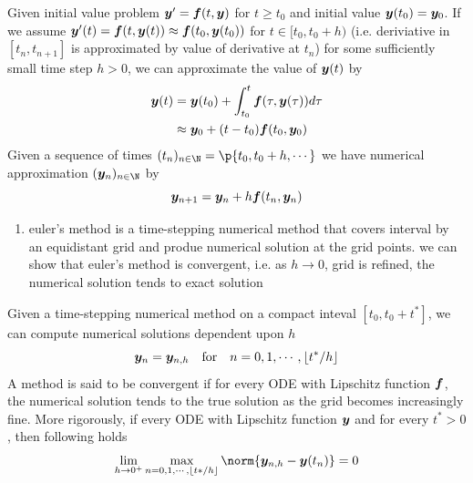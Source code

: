 \documentclass[11pt]{article}
\begin{document}
\begin{definition*}
     Given initial value problem $\by' = \bf(t, \by)$ for $t\geq t_0$ and initial value $\by(t_0) = \by_0$. If we assume $\by'(t) = \bf(t, \by(t)) \approx \bf(t_0, \by(t_0))$ for $t\in [t_0,t_0+h)$ (i.e. deriviative in $[t_n, t_{n+1}]$ is approximated by value of derivative at $t_n$) for some sufficiently small time step $h>0$, we can approximate the value of $\by(t)$ by
    \begin{align*}
        \by(t) 
        &= \by(t_0) + \int_{t_0}^t \bf(\tau, \by(\tau)) d\tau  \\
        &\approx \by_0 + (t-t_0) \bf(t_0, \by_0)
    \end{align*}
    Given a sequence of times $(t_n)_{n\in\N} = \p{t_0, t_0+h,\cdots}$ we have numerical approximation $(\by_n)_{n\in\N}$ by 
    \[
        \by_{n+1} = \by_n + h\bf(t_n, \by_n)
    \]
    \begin{enumerate}
        \item {} euler's method is a time-stepping numerical method that covers interval by an equidistant grid and produe numerical solution at the grid points. we can show that euler's method is convergent, i.e. as $h\to 0$, grid is refined, the numerical solution tends to exact solution
    \end{enumerate}
\end{definition*}

\begin{definition*}
     Given a time-stepping numerical method on a compact inteval $[t_0, t_0+t^*]$, we can compute numerical solutions dependent upon $h$
    \[
        \by_n = \by_{n,h}
        \quad \text{for}
        \quad n = 0,1,\cdots,\lfloor t^*/h\rfloor    
    \]
    A method is said to be convergent if for every ODE with Lipschitz function $\bf$, the numerical solution tends to the true solution as the grid becomes increasingly fine. More rigorously, if every ODE with Lipschitz function $\by$ and for every $t^*>0$, then following holds 
    \[
        \lim_{h\to 0^+} \max_{n=0,1,\cdots,\lfloor t*/h\rfloor    } \norm{\by_{n,h} - \by(t_n)} = 0
    \]
\end{definition*}
\end{document}
